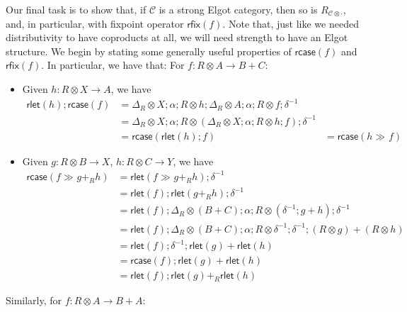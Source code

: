 \documentclass[acmsmall,screen,review]{acmart}
\newcommand{\mc}[1]{\ensuremath{\mathcal{#1}}}
\newcommand{\ms}[1]{\ensuremath{\mathsf{#1}}}
\newcommand{\dmor}[1]{{\Delta}_{#1}}
\newcommand{\envcom}[2]{{#1}_{#2 \otimes \cdot}}
\newcommand{\rlmor}[1]{\ms{rlet}(#1)}
\newcommand{\rcase}[1]{\ms{rcase}(#1)}
\newcommand{\rfix}[1]{\ms{rfix}(#1)}
\newcommand{\rseq}[3]{#2 \gg_{#1} #3}
\begin{document}
Our final task is to show that, if $\mc{C}$ is a strong Elgot category, then so is
$\envcom{R}{\mc{C}}$, and, in particular, with fixpoint operator $\rfix{f}$. Note that, just like we
needed distributivity to have coproducts at all, we will need strength to have an Elgot structure.
We begin by stating some generally useful properties of $\rcase{f}$ and $\rfix{f}$. In particular,
we have that: For $f: R \otimes A \to B + C$:
\begin{itemize}
  \item Given $h : R \otimes X \to A$, we have
  \begin{equation}
    \begin{aligned}
    \rlmor{h} ; \rcase{f} 
    & = \dmor{R} \otimes X ; \alpha ; R \otimes h 
      ; \dmor{R} \otimes A ; \alpha ; R \otimes f ; \delta^{-1} \\
    & = \dmor{R} \otimes X ; \alpha 
      ; R \otimes (\dmor{R} \otimes X ; \alpha ; R \otimes h ; f) ; \delta^{-1} \\
    & = \rcase{\rlmor{h} ; f} & = \rcase{\rseq{}{h}{f}}
    \end{aligned}
  \end{equation}
  \item Given $g : R \otimes B \to X$, $h : R \otimes C \to Y$, we have
  \begin{equation}
    \begin{aligned}
    \rcase{\rseq{}{f}{g +_R h}}
    & = \rlmor{\rseq{}{f}{g +_R h}} ; \delta^{-1} \\
    & = \rlmor{f} ; \rlmor{g +_R h} ; \delta^{-1} \\
    & = \rlmor{f} 
      ; \dmor{R} \otimes (B + C) ; \alpha ; R \otimes (\delta^{-1} ; g + h) ; \delta^{-1} \\
    & = \rlmor{f} 
      ; \dmor{R} \otimes (B + C) ; \alpha ; R \otimes \delta^{-1} ; \delta^{-1} 
      ; (R \otimes g) + (R \otimes h) \\
    & = \rlmor{f} ; \delta^{-1} ; \rlmor{g} + \rlmor{h} \\
    & = \rcase{f} ; \rlmor{g} + \rlmor{h} \\
    & = \rlmor{f} ; \rlmor{g} +_R \rlmor{h}
    \end{aligned}
  \end{equation}
\end{itemize}
Similarly, for $f : R \otimes A \to B + A$:
\end{document}
